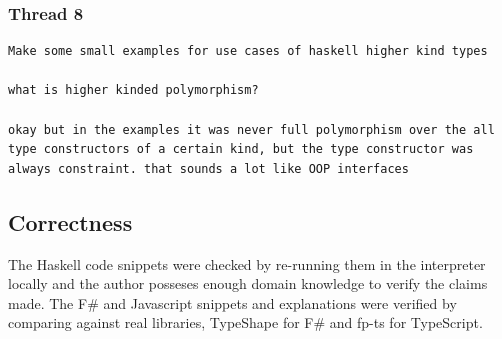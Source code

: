 \documentclass[12pt,oneside,a4paper]{article}
\begin{document}
\subsubsection*{Thread 8}
\begin{lstlisting}
Make some small examples for use cases of haskell higher kind types

what is higher kinded polymorphism?

okay but in the examples it was never full polymorphism over the all type constructors of a certain kind, but the type constructor was always constraint. that sounds a lot like OOP interfaces
\end{lstlisting}


\subsection{Correctness}
The Haskell code snippets were checked by re-running them in the interpreter locally and the author posseses enough domain knowledge to verify the claims made. The F\# and Javascript snippets and explanations were verified by comparing against real libraries, TypeShape for F\# and fp-ts for TypeScript.



\printbibliography
\end{document}
